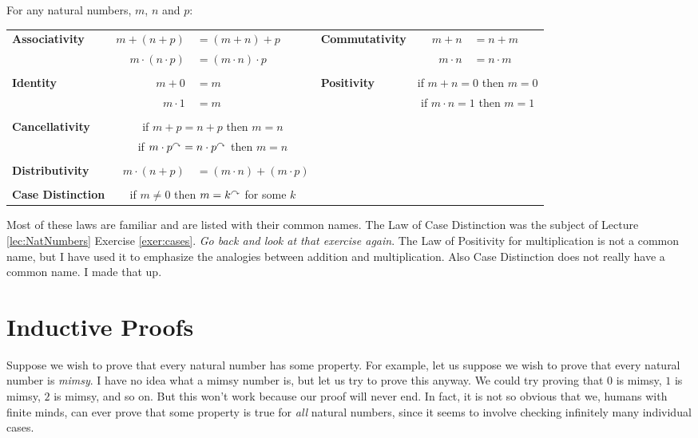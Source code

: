 \begin{laws}
\noindent For any natural numbers, $m$, $n$ and $p$:

\begin{tabular}{lr@{\,}l@{\qquad}lr@{\,}l}
\textbf{Associativity}& $m + (n + p)$      &$= (m+n)+p$           &\textbf{Commutativity}&$m + n$    &$= n + m$\\
                      &$m \cdot(n\cdot p)$ &$= (m\cdot n)\cdot p$ &                      &$m\cdot n$ &$= n\cdot m$\\
&&&&&\\ 
\textbf{Identity}&$m + 0$    &$= m$&\textbf{Positivity}&\multicolumn{2}{c}{if $m + n = 0$ then $m=0$}\\
                 &$m\cdot 1$ &$= m$&                   &\multicolumn{2}{c}{if $m\cdot n = 1$ then $m=1$}\\
&&&&&\\
\textbf{Cancellativity}&\multicolumn{2}{c}{if $m + p = n+p$ then $m=n$}&&&\\
                       &\multicolumn{2}{c}{if $m \cdot p^\curvearrowright = n\cdot p^\curvearrowright$ then $m=n$}&&&\\
&&&&&\\
\textbf{Distributivity}&$m\cdot(n+p)$&$= (m\cdot n) + (m\cdot p)$&&&\\
&&&&&\\
\textbf{Case Distinction}&\multicolumn{2}{c}{if $m\neq 0$ then $m=k^\curvearrowright$ for some $k$}&&&\\
\end{tabular}
\end{laws}
\medskip

Most of these laws are familiar and are listed with their common names. The Law of Case
Distinction was the subject of Lecture \ref{lec:NatNumbers} Exercise \ref{exer:cases}. \emph{Go back and look at that exercise again}.
The Law of Positivity for multiplication is not a common name, but
I have used it to emphasize the analogies between addition and multiplication.
Also Case Distinction does not really have a common name. I made that up.

\ipadbreak

\section{Inductive Proofs}

Suppose we wish to prove that every natural number has some
property. For example, let us suppose we wish to prove that every
natural number is \emph{mimsy}.  I have no idea what a mimsy number
is, but let us try to prove this anyway. We could try proving that $0$
is mimsy, $1$ is mimsy, $2$ is mimsy, and so on.  But this won't work
because our proof will never end. In fact, it is not so obvious that
we, humans with finite minds, can ever prove that some property is
true for \emph{all} natural numbers, since it seems to involve
checking infinitely many individual cases.

